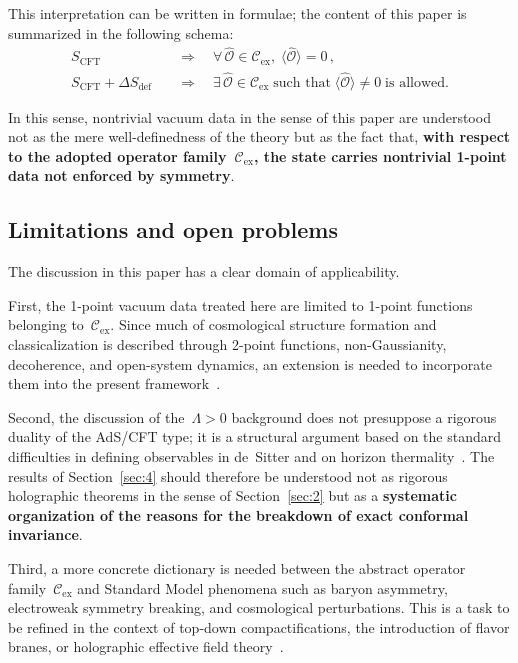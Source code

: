 \documentclass[
  aps,
  prd,
  preprint,
  groupedaddress,
  nofootinbib,
  longbibliography
]{revtex4-2}
\theoremstyle{remark}
\newcommand{\Cex}{\mathcal{C}_{\mathrm{ex}}}
\begin{document}
This interpretation can be written in formulae; the content of
this paper is summarized in the following schema:
\begin{align}
  S_{\mathrm{CFT}}
  &\quad\Longrightarrow\quad
  \forall\,\hat{\mathcal{O}}\in\Cex,\;
  \langle\hat{\mathcal{O}}\rangle = 0\,,
  \label{eq:schema-vanish}\\[6pt]
  S_{\mathrm{CFT}}+\Delta S_{\mathrm{def}}
  &\quad\Longrightarrow\quad
  \exists\,\hat{\mathcal{O}}\in\Cex
  \;\text{such that}\;
  \langle\hat{\mathcal{O}}\rangle \neq 0
  \;\text{is allowed.}
  \label{eq:schema-nonzero}
\end{align}

In this sense, nontrivial vacuum data in the sense of this paper
are understood not as the mere well-definedness of the theory
but as the fact that, \textbf{with respect to the adopted
operator family~$\Cex$, the state carries nontrivial 1-point
data not enforced by symmetry}.

\subsection{Limitations and open problems}\label{subsec:5-8}

The discussion in this paper has a clear domain of applicability.

First, the 1-point vacuum data treated here are limited to
1-point functions belonging to~$\Cex$.
Since much of cosmological structure formation and
classicalization is described through 2-point functions,
non-Gaussianity, decoherence, and open-system dynamics, an
extension is needed to incorporate them into the present
framework~\cite{ref24,ref25}.

Second, the discussion of the~$\Lambda>0$ background does not
presuppose a rigorous duality of the AdS/CFT type; it is a
structural argument based on the standard difficulties in
defining observables in de~Sitter and on horizon
thermality~\cite{ref15,ref16,ref17,ref18,ref19,ref20,ref21}.
The results of Section~\ref{sec:4} should therefore be understood
not as rigorous holographic theorems in the sense of
Section~\ref{sec:2} but as a \textbf{systematic organization
of the reasons for the breakdown of exact conformal invariance}.

Third, a more concrete dictionary is needed between the
abstract operator family~$\Cex$ and Standard Model phenomena
such as baryon asymmetry, electroweak symmetry breaking, and
cosmological perturbations.
This is a task to be refined in the context of top-down
compactifications, the introduction of flavor branes, or
holographic effective field
theory~\cite{ref4,ref7,ref8}.
\end{document}
